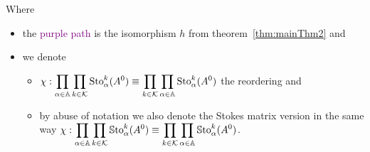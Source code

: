 Where
\begin{itemize}
  \item the \textcolor{purple}{purple path} is the isomorphism $h$ from
    theorem~\ref{thm:mainThm2} and
  \item we denote
    \begin{itemize}
      \item $\chi:\displaystyle \prod_{\alpha\in\mathbb{A}}\prod_{k\in\mathcal{K}}\operatorname{Sto}_\alpha^k(A^0)
        \equiv\displaystyle \prod_{k\in\mathcal{K}}\prod_{\alpha\in\mathbb{A}}\operatorname{Sto}_\alpha^k(A^0)$
        the reordering and 
      \item by abuse of notation we also denote the Stokes matrix version in
        the same way
        $\chi:\displaystyle \prod_{\alpha\in\mathbb{A}}\prod_{k\in\mathcal{K}}\operatorname{\mathbb{S}to}_\alpha^k(A^0)
        \equiv\displaystyle
        \prod_{k\in\mathcal{K}}\prod_{\alpha\in\mathbb{A}}\operatorname{\mathbb{S}to}_\alpha^k(A^0)$.
    \end{itemize}
\end{itemize}

